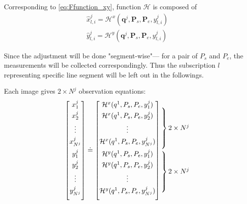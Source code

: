 Corresponding to \cref{eq:Ffunction_xy}, function $\mathcal{H}$ is composed of
\begin{equation}
\begin{split}
\hat{x}^j_{l,i} = \mathcal{H}^x(\mathbf{q}^j,\mathbf{P}_s,\mathbf{P}_e,y^j_{l,i})\\
\hat{y}^j_{l,i} = \mathcal{H}^y(\mathbf{q}^j,\mathbf{P}_s,\mathbf{P}_e,y^j_{l,i})
\end{split}
\end{equation}

Since the adjustment will be done "segment-wise"--- for a pair of $P_s$ and $P_e$, the measurements will be collected correspondingly. %
Thus the subscription $l$ representing specific line segment will be left out in the followings.

Each image gives $2\times N^j$ observation equations:
\begin{equation} \label{eq:obs-camera1}
\begin{bmatrix}
 x^j_{1}\\[0.3em]
 x^j_{2}\\[0.3em]
 \vdots\\[0.3em]
 x^j_{N^j}\\[0.5em]
 y^j_{1}\\[0.3em]
 y^j_{2}\\[0.3em]
 \vdots\\[0.3em]
 y^j_{N^j}\\[0.8em]
\end{bmatrix}
\doteq %
\begin{bmatrix}
 \mathcal{H}^x(q^1,P_s,P_e,y^j_{1})\\[0.3em]
 \mathcal{H}^x(q^1,P_s,P_e,y^j_{2})\\[0.3em]
 \vdots\\[0.3em]
 \mathcal{H}^x(q^1,P_s,P_e,y^j_{N^j})\\[0.5em]
 \mathcal{H}^y(q^1,P_s,P_e,y^j_{1})\\[0.3em]
 \mathcal{H}^y(q^1,P_s,P_e,y^j_{2})\\[0.3em]
 \vdots\\[0.3em]
 \mathcal{H}^y(q^1,P_s,P_e,y^j_{N^j})\\[0.8em]
\end{bmatrix}
\begin{array}{@{\kern-\nulldelimiterspace}l@{}}
 \left.\begin{array}{@{}c@{}}\\[0.3em] \\[0.3em] \\[0.3em] \\[0.5em] \end{array}\right\}2\times N^j\\
 \left.\begin{array}{@{}c@{}}\\[0.3em] \\[0.3em] \\[0.3em] \\[0.8em] \end{array}\right\}2\times N^j\\
\end{array}
\end{equation}
